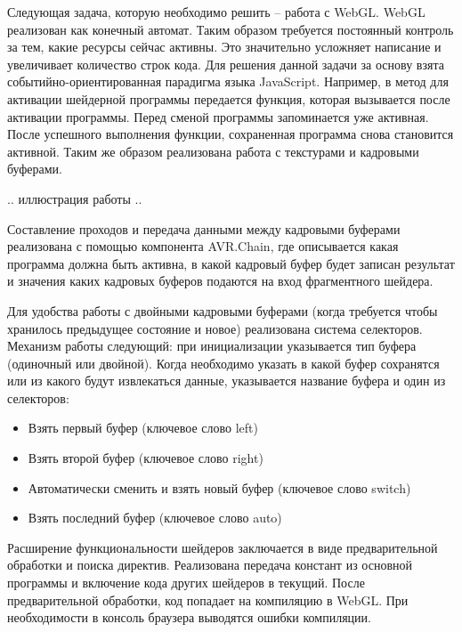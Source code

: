
Следующая задача, которую необходимо решить -- работа с WebGL. WebGL реализован как конечный
автомат. Таким образом требуется постоянный контроль за тем, какие ресурсы сейчас активны. Это
значительно усложняет написание и увеличивает количество строк кода. Для решения данной задачи
за основу взята событийно-ориентированная парадигма языка JavaScript. 
Например, в метод для активации шейдерной программы передается функция, которая
вызывается после активации программы. Перед сменой программы запоминается уже активная. 
После успешного выполнения функции, сохраненная программа снова становится активной.
Таким же образом реализована работа с текстурами и кадровыми буферами.

.. иллюстрация работы ..

Составление проходов и передача данными между кадровыми буферами реализована с помощью
компонента AVR.Chain, где описывается какая программа должна быть активна, в какой
кадровый буфер будет записан результат и значения каких кадровых буферов подаются на вход
фрагментного шейдера.

Для удобства работы с двойными кадровыми буферами (когда требуется чтобы хранилось предыдущее
состояние и новое) реализована система селекторов. Механизм работы следующий: при инициализации
указывается тип буфера (одиночный или двойной). Когда необходимо указать в какой буфер сохранятся 
или из какого будут извлекаться данные, указывается название буфера и один из селекторов:

\begin{itemize}
  \item Взять первый буфер (ключевое слово left)
  \item Взять второй буфер (ключевое слово right)
  \item Автоматически сменить и взять новый буфер (ключевое слово switch)
  \item Взять последний буфер (ключевое слово auto)
\end{itemize}

Расширение функциональности шейдеров заключается в виде предварительной обработки
и поиска директив. Реализована передача констант из основной программы и включение
кода других шейдеров в текущий. После предварительной обработки, код попадает на компиляцию
в WebGL. При необходимости в консоль браузера выводятся ошибки компиляции.

